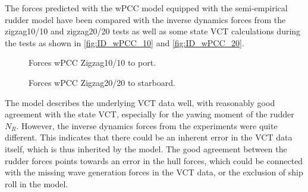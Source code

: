 \noindent The forces predicted with the wPCC model equipped with the semi-empirical rudder model have been compared with the inverse dynamics forces from the zigzag10/10 and zigzag20/20 tests as well as some state VCT calculations during the tests as shown in \autoref{fig:ID_wPCC_10} and \autoref{fig:ID_wPCC_20}.   
\begin{figure}[h!]
     \centering
     
     \caption{Forces wPCC Zigzag10/10 to port.}
     \label{fig:ID_wPCC_10}
\end{figure}

\vspace{-0.4cm}
\begin{figure}[h]
    \centering
    
    \caption{Forces wPCC Zigzag20/20 to starboard.}
    \label{fig:ID_wPCC_20}
\end{figure}
%         
%         
The model describes the underlying VCT data well, with reasonably good agreement with the state VCT, especially for the yawing moment of the rudder $N_R$. However, the inverse dynamics forces from the experiments were quite different. This indicates that there could be an inherent error in the VCT data itself, which is thus inherited by the model. The good agreement between the rudder forces points towards an error in the hull forces, which could be connected with the missing wave generation forces in the VCT data, or the exclusion of ship roll in the model.